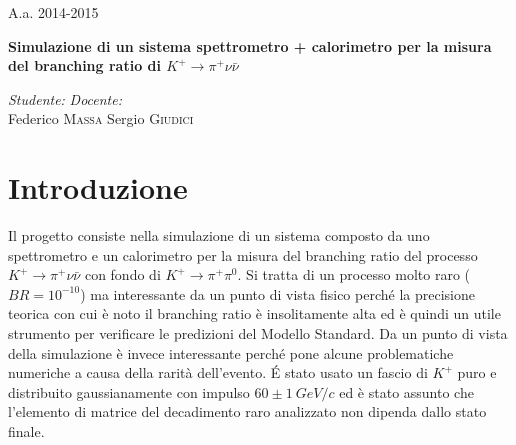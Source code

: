 \documentclass[8pt]{extarticle}
\begin{document}
\Large{A.a. 2014-2015}
\vspace{10cm}
\begin{center}
\Huge\textbf{Simulazione di un sistema spettrometro + calorimetro per la misura del branching ratio di $K^+ \rightarrow \pi^+ \nu \bar{\nu}$}
\end{center}

\vspace{2cm}
\begin{flushleft}
\medskip
\textit{Studente:} 
\hspace{10 cm}
\textit{Docente:} \\
\medskip
Federico \textsc{Massa}
\hspace{9 cm}
Sergio \textsc{Giudici}
\end{flushleft}



\newpage

\begin{abstract}
\justify
\'E stato simulato un apparato sperimentale composto da uno spettrometro e da un calorimetro non segmentato per la misura del branching ratio del processo raro
$K^+ \rightarrow \pi^+ \nu \bar{\nu}$, considerando il fondo degli eventi $K^+ \rightarrow \pi^+ \pi^0$, in cui i fotoni provenienti
dal decadimento del $\pi^0$ non sono rivelati. Considerato il rate di $K^+$ dell'esperimento NA62\cite{NA62 flux}, si ottiene un valore del tempo di misura necessario a misurare il branching ratio
con una precisione del 10\% impraticabile, che rende necessario l'utilizzo di un sistema di rivelazione di fotoni.
\end{abstract}
\bigskip

\doublespacing
\tableofcontents
\singlespacing

\newpage

\section{Introduzione} \label{sec:intro}
\justify
Il progetto consiste nella simulazione di un sistema composto da uno spettrometro e un calorimetro per la misura del branching ratio del processo $K^+ \rightarrow \pi^+ \nu \bar{\nu}$ con fondo di $K^+ \rightarrow \pi^+ \pi^0$. Si tratta di un processo molto raro ($BR = 10^{-10}$) ma interessante da un punto di vista fisico perché la precisione teorica con cui è noto il branching ratio è insolitamente alta ed è quindi un utile strumento per verificare le predizioni del Modello Standard\cite{NA62}. Da un punto di vista della simulazione è invece interessante perché pone alcune problematiche numeriche a causa della rarità dell'evento. \'E stato usato un fascio di $K^+$ puro e distribuito gaussianamente con impulso $60 \pm 1\ GeV/c$ ed è stato assunto che l'elemento di matrice del decadimento raro analizzato non dipenda dallo stato finale. \\
\end{document}
